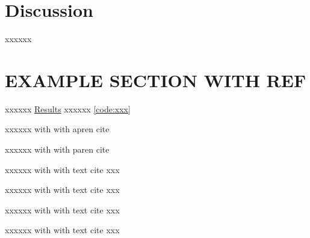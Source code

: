 \documentclass[a4paper, 11pt]{article}
\begin{document}
    \section*{Discussion}
    \label{sec:discussion}
    xxxxxx
    \section*{EXAMPLE SECTION WITH REF}
    xxxxxx 
    \hyperref[sec:results]{Results}
    xxxxxx 
    \autoref{code:xxx}

    xxxxxx with with apren cite 
    \parencite{Segeqick2011Alg4th}

    xxxxxx with with paren cite 
    \parencite{CormenThomasH2022ItA}

    xxxxxx with with text cite 
    \textcite{Segeqick2011Alg4th}
    xxx

    xxxxxx with with text cite 
    \citep{Segeqick2011Alg4th}
    xxx

    xxxxxx with with text cite 
    \citet{Segeqick2011Alg4th}
    xxx

    xxxxxx with with text cite 
    \citep{CormenThomasH2022ItA}
    xxx


\printbibliography
\end{document}
